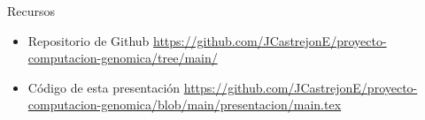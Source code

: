 \documentclass{beamer}
\begin{document}
\begin{frame}{Recursos}
\begin{itemize}
\item Repositorio de Github \url{https://github.com/JCastrejonE/proyecto-computacion-genomica/tree/main/}
\item Código de esta presentación \url{https://github.com/JCastrejonE/proyecto-computacion-genomica/blob/main/presentacion/main.tex}
\end{itemize}
\end{frame}
\end{document}
